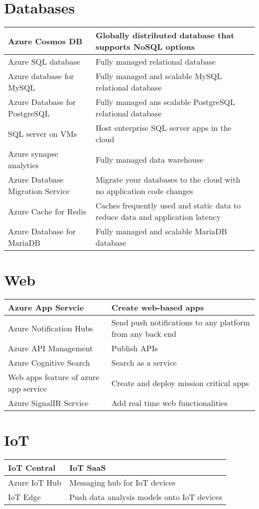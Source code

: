 \documentclass{article}[18pt]
\begin{document}
\section{Databases}
{\renewcommand{\arraystretch}{2}
	\begin{tabularx}{\textwidth}{X X}
		
		Azure Cosmos DB& Globally distributed database that supports NoSQL options\\
		\hline
		Azure SQL database& Fully managed relational database\\
		\hline
		Azure database for MySQL& Fully managed and scalable MySQL relational database\\
		\hline
		Azure Database for PostgreSQL & Fully managed ans scalable PostgreSQL relational database\\
		\hline 
		SQL server on VMs& Host enterprise SQL server apps in the cloud\\
		\hline
		Azure synapse analytics& Fully managed data warehouse\\
		\hline
		Azure Database Migration Service& Migrate your databases to the cloud with no application code changes\\
		\hline
		Azure Cache for Redis& Caches frequently used and static data to reduce data and application latency\\
		\hline
		Azure Database for MariaDB& Fully managed and scalable MariaDB database
		
		
	\end{tabularx}
}
\section{Web}
{\renewcommand{\arraystretch}{2}
	\begin{tabularx}{\textwidth}{X X}
		
		Azure App Servcie & Create web-based apps\\
		\hline
		Azure Notification Hubs& Send push notifications to any platform from any back end\\
		\hline
		Azure API Management& Publish APIs\\
		\hline
		Azure Cognitive Search& Search as a service\\
		\hline
		Web apps feature of azure app service& Create and deploy mission critical apps\\
		\hline
		Azure SignalIR Service & Add real time web functionalities
		
		
	\end{tabularx}
}
\section{IoT}
{\renewcommand{\arraystretch}{2}
	\begin{tabularx}{\textwidth}{X X}
		
		IoT Central& IoT SaaS\\
		\hline
		Azure IoT Hub& Messaging hub for IoT devices\\
		\hline
		IoT Edge& Push data analysis models onto IoT devices
		
		
		
	\end{tabularx}
}
\end{document}

